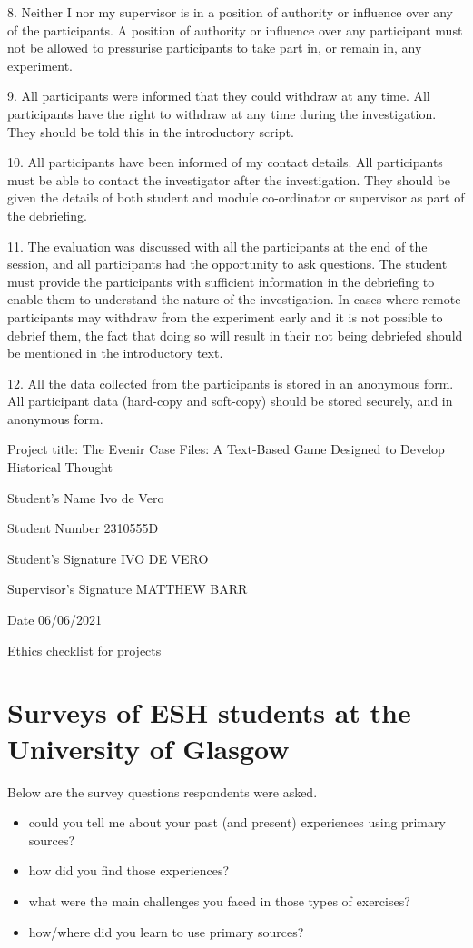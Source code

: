 \documentclass{l4proj}
\begin{document}
\begin{appendices}
8.	Neither I nor my supervisor is in a position of authority or influence over any of the participants.
A position of authority or influence over any participant must not be allowed to pressurise participants to take part in, or remain in, any experiment. 

9.	All participants were informed that they could withdraw at any time.
All participants have the right to withdraw at any time during the investigation. They should be told this in the introductory script.

10.	All participants have been informed of my contact details.
All participants must be able to contact the investigator after the investigation. They should be given the details of both student and module co-ordinator or supervisor as part of the debriefing.

11.	The evaluation was discussed with all the participants at the end of the session, and all participants had the opportunity to ask questions.
The student must provide the participants with sufficient information in the debriefing to enable them to understand the nature of the investigation. In cases where remote participants may withdraw from the experiment early and it is not possible to debrief them, the fact that doing so will result in their not being debriefed should be mentioned in the introductory text.

12.	All the data collected from the participants is stored in an anonymous form.
All participant data (hard-copy and soft-copy) should be stored securely, and in anonymous form. 




Project title: The Evenir Case Files: A Text-Based Game Designed to Develop Historical Thought

Student’s Name   Ivo de Vero

Student Number 2310555D

Student’s Signature IVO DE VERO

Supervisor’s Signature MATTHEW BARR

Date 06/06/2021


Ethics checklist for projects


\chapter{Surveys of ESH students at the University of Glasgow}

Below are the survey questions respondents were asked.

\begin{itemize}
    \item could you tell me about your past (and present) experiences using primary sources?
    \item how did you find those experiences?
    \item what were the main challenges you faced in those types of exercises?
    \item how/where did you learn to use primary sources? 
\end{itemize}



\end{appendices}
\end{document}
